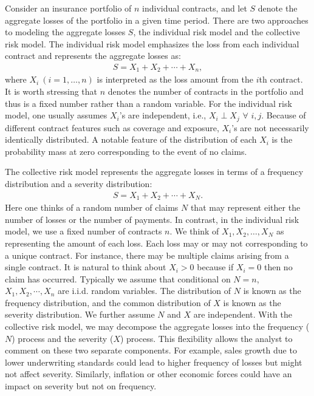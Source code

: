 \documentclass[12pt,letterpaper]{article}
\begin{document}
Consider an insurance portfolio of $n$ individual contracts, and let $S$ denote the aggregate losses of the portfolio in a given time period. There are two approaches to modeling the aggregate losses $S$, the individual risk model and the collective risk model. The individual risk model emphasizes the loss from each individual contract and represents the aggregate losses as:
\begin{align*}
S=X_1 +X_2 +\cdots+X_n,
\end{align*}
where $X_i~(i=1,\ldots,n)$ is interpreted as the loss amount from the $i$th contract. It is worth stressing that $n$ denotes the number of contracts in the portfolio and thus is a fixed number rather than a random variable. For the individual risk model, one usually assumes $X_{i}$'s are independent, i.e., $X_{i}\perp X_{j}$ $\forall $ $i,j$. Because of different contract features such as coverage and exposure, $X_{i}$'s are not necessarily identically
distributed. A notable feature of the distribution of each $X_i$ is the probability mass at zero corresponding to the event of no claims.

The collective risk model represents the aggregate losses in terms of a frequency distribution and a severity distribution:
\begin{align*}
S=X_1 +X_2 +\cdots+X_N.
\end{align*}
Here one thinks of a random number of claims $N$ that may represent either the number of losses or the number of payments. In contrast, in the individual risk model, we use a fixed number of contracts $n$. We think of $X_1, X_2, \ldots, X_N$ as representing the amount of each loss. Each loss may or may not corresponding to a unique contract. For instance, there may be multiple claims arising from a single contract. It is natural to think about $X_i>0$ because if $X_i=0$ then no claim has occurred. Typically we assume that conditional on $N=n$, $X_{1},X_{2},\cdots ,X_{n}$ are i.i.d. random variables. The distribution of $N$ is known as the frequency distribution, and the common distribution of $X$ is known as the severity distribution. We further assume $N$ and $X$ are independent. With the collective risk model, we may decompose the aggregate losses into the frequency ($N$) process and the severity ($X$) process. This flexibility allows the analyst to comment on these two separate components. For example, sales growth due to lower underwriting standards could lead to higher frequency of losses but might not affect severity. Similarly, inflation or other economic forces could have an impact on severity but not on frequency.
\end{document}
